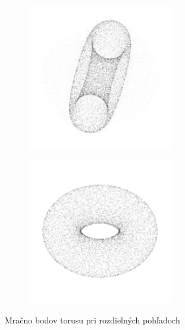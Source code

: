 \begin{figure}[!h]
	\centering
	\begin{subfigure}[b]{0.45\textwidth}
		\centering
		\includegraphics[width=0.7\textwidth]{figures/point_cloud_a.png}
		\caption{}
		\label{fig:point_cloud:a}
	\end{subfigure}
	\begin{subfigure}[b]{0.45\textwidth}
		\centering
		\includegraphics[width=0.7\textwidth]{figures/point_cloud_b.png}
		\caption{}
		\label{fig:point_cloud:b}
	\end{subfigure}
	\caption{Mračno bodov torusu pri rozdielných pohľadoch}
	\label{fig:point_cloud}
\end{figure}


